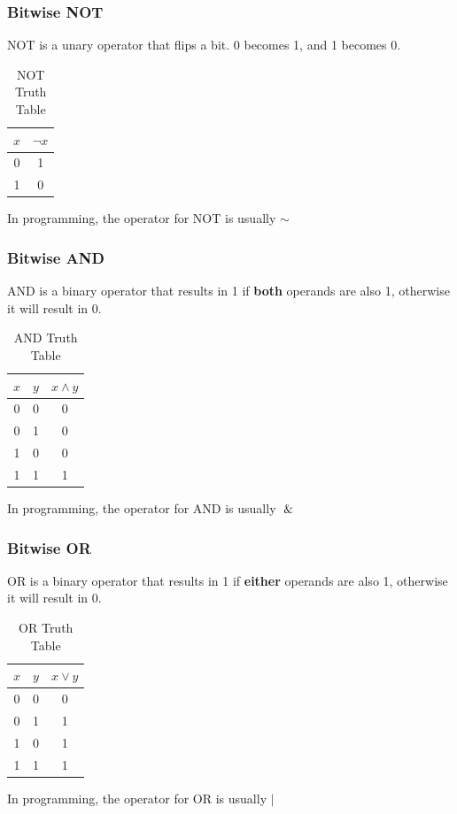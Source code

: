 \documentclass{article}
\begin{document}
\subsubsection{Bitwise NOT}
NOT is a unary operator that flips a bit. 0 becomes 1, and 1 becomes 0.
\begin{table}[h]
    \centering
    \caption{NOT Truth Table}
    \begin{tabular}{c|c}
        \(x\) & \(\neg x\) \\ \hline
        0     & 1          \\
        1     & 0          \\
    \end{tabular}
\end{table}
\begin{tcolorbox}[title=Note]
    In programming, the operator for NOT is usually \(\sim\)
\end{tcolorbox}
%
\subsubsection{Bitwise AND}
AND is a binary operator that results in 1 if \textbf{both} operands are also 1,
otherwise it will result in 0.
\begin{table}[h]
    \centering
    \caption{AND Truth Table}
    \begin{tabular}{c|c|c}
        \(x\) & \(y\) & \(x \wedge y\) \\ \hline
        0     & 0     & 0              \\
        0     & 1     & 0              \\
        1     & 0     & 0              \\
        1     & 1     & 1              \\
    \end{tabular}
\end{table}
\begin{tcolorbox}[title=Note]
    In programming, the operator for AND is usually \(\And\)
\end{tcolorbox}
%
\newpage
\subsubsection{Bitwise OR}
OR is a binary operator that results in 1 if \textbf{either} operands are also 1,
otherwise it will result in 0.
\begin{table}[h]
    \centering
    \caption{OR Truth Table}
    \begin{tabular}{c|c|c}
        \(x\) & \(y\) & \(x \vee y\) \\ \hline
        0     & 0     & 0            \\
        0     & 1     & 1            \\
        1     & 0     & 1            \\
        1     & 1     & 1            \\
    \end{tabular}
\end{table}
\begin{tcolorbox}[title=Note]
    In programming, the operator for OR is usually \(\vert\)
\end{tcolorbox}
%
\end{document}
